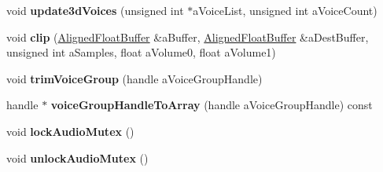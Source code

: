 \begin{DoxyCompactItemize}
\item 
\mbox{\label{class_so_loud_1_1_soloud_ac65d06e0f6c2e8d861a6b99a9d1de2c8}} 
void {\bfseries update3d\+Voices} (unsigned int $\ast$a\+Voice\+List, unsigned int a\+Voice\+Count)
\item 
\mbox{\label{class_so_loud_1_1_soloud_a05629468100c7ddab95f3f6465e08b1e}} 
void {\bfseries clip} (\mbox{\hyperlink{class_so_loud_1_1_aligned_float_buffer}{Aligned\+Float\+Buffer}} \&a\+Buffer, \mbox{\hyperlink{class_so_loud_1_1_aligned_float_buffer}{Aligned\+Float\+Buffer}} \&a\+Dest\+Buffer, unsigned int a\+Samples, float a\+Volume0, float a\+Volume1)
\item 
\mbox{\label{class_so_loud_1_1_soloud_a354866cc49d3c0f9b708706930d62e32}} 
void {\bfseries trim\+Voice\+Group} (handle a\+Voice\+Group\+Handle)
\item 
\mbox{\label{class_so_loud_1_1_soloud_a7f6521104e3474c1e850573f298ed8e2}} 
handle $\ast$ {\bfseries voice\+Group\+Handle\+To\+Array} (handle a\+Voice\+Group\+Handle) const
\item 
\mbox{\label{class_so_loud_1_1_soloud_a59103a03b7f9ab2f9b90218f0e485804}} 
void {\bfseries lock\+Audio\+Mutex} ()
\item 
\mbox{\label{class_so_loud_1_1_soloud_ae1ec4787ee6e94ad52d74eb1fe311331}} 
void {\bfseries unlock\+Audio\+Mutex} ()
\end{DoxyCompactItemize}

